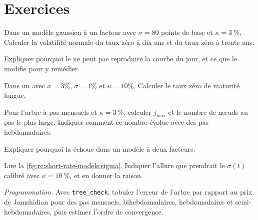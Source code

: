\section{Exercices}

\begin{exercise}[$\star$]\label{exo:rc:short-rate-models:1}
Dans un modèle gaussien à un facteur avec $\sigma = 80$ points de base et $\kappa = 3~\%$,
Calculer la volatilité normale du taux zéro à dix ans et du taux zéro à trente ans.
\end{exercise}

\begin{exercise}[$\star$]\label{exo:rc:short-rate-models:2}
Expliquer pourquoi le  ne peut pas reproduire la courbe du jour, et ce que
le  modifie pour y remédier.
\end{exercise}

\begin{exercise}[$\star$]\label{exo:rc:short-rate-models:3}
Dans un  avec $\bar x = 3\%$, $\sigma = 1\%$ et $\kappa = 10\%$,
Calculer le taux zéro de maturité longue.
\end{exercise}

\begin{exercise}[$\star\star$]\label{exo:rc:short-rate-models:4}
Pour l'arbre à pas mensuels et $\kappa=3~\%$, calculer $j_{\max}$ et le nombre de
nœuds au pas le plus large. Indiquer comment ce nombre évolue avec des pas hebdomadaires.
\end{exercise}

\begin{exercise}[$\star\star$]\label{exo:rc:short-rate-models:5}
Expliquer pourquoi la  échoue dans un modèle à deux facteurs.
\end{exercise}

\begin{exercise}[$\star\star$]\label{exo:rc:short-rate-models:6}
Lire la \cref{fig:rc:short-rate-models:sigma}. Indiquer l'allure que prendrait le
$\sigma(t)$ calibré avec $\kappa=10~\%$, et en donner la raison.
\end{exercise}

\begin{exercise}[$\star\star\star$]\label{exo:rc:short-rate-models:7}
\emph{Programmation.} Avec \texttt{tree\_check}, tabuler l'erreur de l'arbre par rapport au prix de
Jamshidian pour des pas mensuels, bihebdomadaires, hebdomadaires et semi-hebdomadaires, puis
estimer l'ordre de convergence.
\end{exercise}

